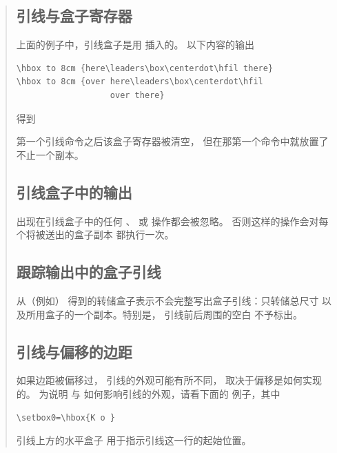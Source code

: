 \documentclass[a4paper]{rapport3}
\newenvironment{disp}{\begin{quotation}}{\end{quotation}}
\begin{document}
\begin{disp}
\subsection{引线与盒子寄存器}

上面的例子中，引线盒子是用  插入的。
以下内容的输出
\begin{verbatim}
\hbox to 8cm {here\leaders\box\centerdot\hfil there}
\hbox to 8cm {over here\leaders\box\centerdot\hfil 
                   over there}
\end{verbatim}
得到
\begin{disp}\leavevmode
     \end{disp}
第一个引线命令之后该盒子寄存器被清空，
但在那第一个命令中就放置了不止一个副本。

\subsection{引线盒子中的输出}

出现在引线盒子中的任何 、 或 
操作都会被忽略。
否则这样的操作会对每个将被送出的盒子副本
都执行一次。

\subsection{跟踪输出中的盒子引线}

从（例如）
得到的转储盒子表示不会完整写出盒子引线：只转储总尺寸
以及所用盒子的一个副本。特别是，
引线前后周围的空白
不予标出。

\subsection{引线与偏移的边距}

如果边距被偏移过，
引线的外观可能有所不同，
取决于偏移是如何实现的。
为说明  与 
如何影响引线的外观，请看下面的
例子，其中
\begin{verbatim}
\setbox0=\hbox{K o }
\end{verbatim}
引线上方的水平盒子
\altt
用于指示引线这一行的起始位置。


\end{disp}
\end{document}
